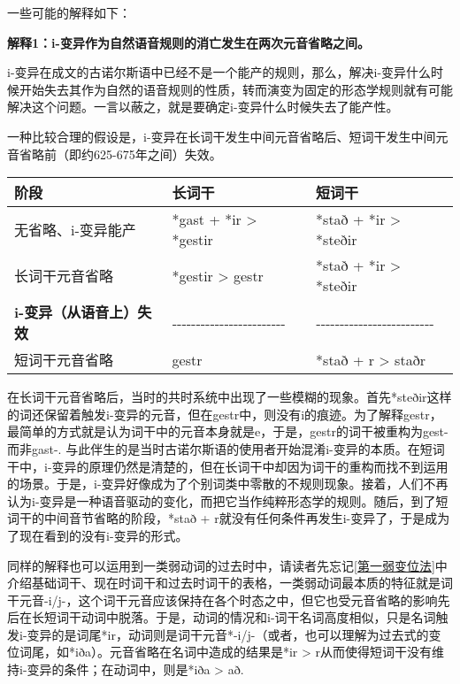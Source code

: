 {{一些可能的解释如下：

\textbf{解释1：i-变异作为自然语音规则的消亡发生在两次元音省略之间。}

i-变异在成文的古诺尔斯语中已经不是一个能产的规则，那么，解决i-变异什么时候开始失去其作为自然的语音规则的性质，转而演变为固定的形态学规则就有可能解决这个问题。一言以蔽之，就是要确定i-变异什么时候失去了能产性。

一种比较合理的假设是，i-变异在长词干发生中间元音省略后、短词干发生中间元音省略前（即约625-675年之间）失效。

\begin{longtable}{lll}
  \toprule
  阶段                            & 长词干                             & 短词干                         \\
  \midrule
  \endhead
  \bottomrule
  \endfoot
  无省略、i-变异能产              & *gast + *ir \textgreater{} *gestir & *stað + *ir
  \textgreater{} *steðir                                                                                \\
  长词干元音省略                  & *gestir \textgreater{} gestr       & *stað + *ir
  \textgreater{} *steðir                                                                                \\
  \textbf{i-变异（从语音上）失效} & ‑‑‑‑‑‑‑‑‑‑‑‑‑‑‑‑‑‑‑‑‑‑‑‑           &
  ‑‑‑‑‑‑‑‑‑‑‑‑‑‑‑‑‑‑‑‑‑‑‑‑‑                                                                             \\
  短词干元音省略                  & gestr                              & *stað + r \textgreater{} staðr \\
\end{longtable}

在长词干元音省略后，当时的共时系统中出现了一些模糊的现象。首先*steðir这样的词还保留着触发i-变异的元音，但在gestr中，则没有i的痕迹。为了解释gestr，最简单的方式就是认为词干中的元音本身就是e，于是，gestr的词干被重构为gest-而非gast-.
与此伴生的是当时古诺尔斯语的使用者开始混淆i-变异的本质。在短词干中，i-变异的原理仍然是清楚的，但在长词干中却因为词干的重构而找不到运用的场景。于是，i-变异好像成为了个别词类中零散的不规则现象。接着，人们不再认为i-变异是一种语音驱动的变化，而把它当作纯粹形态学的规则。随后，到了短词干的中间音节省略的阶段，*stað
+ r就没有任何条件再发生i-变异了，于是成为了现在看到的没有i-变异的形式。

同样的解释也可以运用到一类弱动词的过去时中，请读者先忘记\ref{第一弱变位法}中介绍基础词干、现在时词干和过去时词干的表格，一类弱动词最本质的特征就是词干元音-i/j-，这个词干元音应该保持在各个时态之中，但它也受元音省略的影响先后在长短词干动词中脱落。于是，动词的情况和i-词干名词高度相似，只是名词触发i-变异的是词尾*ir，动词则是词干元音*-i/j-（或者，也可以理解为过去式的变位词尾，如*iða）。元音省略在名词中造成的结果是*ir
\textgreater{} r从而使得短词干没有维持i-变异的条件；在动词中，则是*iða
\textgreater{} að.

}}
